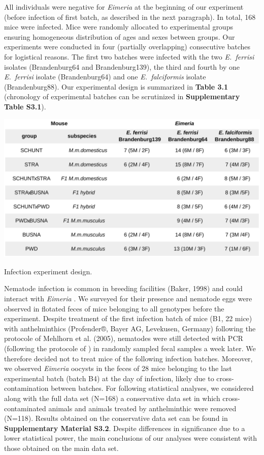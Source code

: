 All individuals were negative for \textit{Eimeria }at the beginning of our experiment (before infection of first batch, as described in the next paragraph). In total, 168 mice were infected. Mice were randomly allocated to experimental groups ensuring homogeneous distribution of ages and sexes between groups. Our experiments were conducted in four (partially overlapping) consecutive batches for logistical reasons. The first two batches were infected with the two \textit{E.~ferrisi }isolates (Brandenburg64 and Brandenburg139), the third and fourth by one \textit{E.~ferrisi }isolate (Brandenburg64) and one \textit{E.~falciformis }isolate (Brandenburg88). Our experimental design is summarized in \textbf{Table 3.1} (chronology of experimental batches can be scrutinized in \textbf{Supplementary Table S3.1}). \par

\begin{table}[H]
	\centering
	\includegraphics[width=\linewidth,height=\textheight,keepaspectratio]{images/3article2/Table1_final.pdf}
	\caption{Infection experiment design.}
\end{table}

Nematode infection is common in breeding facilities (Baker, 1998) and could interact with \textit{Eimeria} \citep{clerc_parasitic_2019}. We surveyed for their presence and nematode eggs were observed in flotated feces of mice belonging to all genotypes before the experiment. Despite treatment of the first infection batch of mice (B1, 22 mice) with anthelminthics (Profender®, Bayer AG, Levekusen, Germany) following the protocole of Mehlhorn et al. (2005), nematodes were still detected with PCR (following the protocole of \cite{floyd_nematode-specific_2005}) in randomly sampled fecal samples a week later. We therefore decided not to treat mice of the following infection batches. Moreover, we observed \textit{Eimeria }oocysts in the feces of 28 mice belonging to the last experimental batch (batch B4) at the day of infection, likely due to cross-contamination between batches. For following statistical analyses, we considered along with the full data set (N=168) a conservative data set in which cross-contaminated animals and animals treated by anthelminthic were removed (N=118). Results obtained on the conservative data set can be found in \textbf{Supplementary Material S3.2}. Despite differences in significance due to a lower statistical power, the main conclusions of our analyses were consistent with those obtained on the main data set.\par


